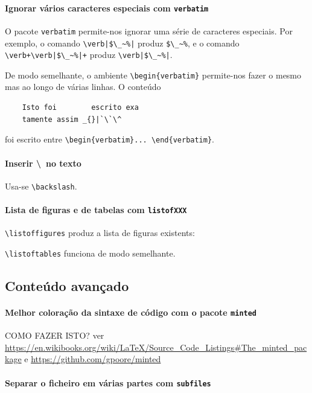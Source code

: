 \documentclass[11pt]{article}
\begin{document}
\paragraph{Ignorar vários caracteres especiais com \texttt{verbatim}}
O pacote \texttt{verbatim} permite-nos ignorar uma série de caracteres especiais.
Por exemplo, o comando \verb+\verb|$\_~%|+ produz \verb|$\_~%|, e o comando
\verb-\verb+\verb|$\_~%|+- produz \verb+\verb|$\_~%|+.

De modo semelhante, o ambiente \verb|\begin{verbatim}| permite-nos fazer o mesmo
mas ao longo de várias linhas. O conteúdo
\begin{verbatim}
    Isto foi        escrito exa
    tamente assim _{}|`\`\^
\end{verbatim}
foi escrito entre \verb|\begin{verbatim}... \end{verbatim}|.

\paragraph{Inserir \textbackslash~no texto}
Usa-se \verb|\backslash|.

\paragraph{Lista de figuras e de tabelas com \texttt{listofXXX}}
\verb|\listoffigures| produz a lista de figuras existents:

\listoffigures

\verb|\listoftables| funciona de modo semelhante.

\subsection{Conteúdo avançado}

\paragraph{Melhor coloração da sintaxe de código com o pacote \texttt{minted}}
{\color{red} COMO FAZER ISTO?} ver
\url{https://en.wikibooks.org/wiki/LaTeX/Source_Code_Listings#The_minted_package} e
\url{https://github.com/gpoore/minted}

\paragraph{Separar o ficheiro em várias partes com \texttt{subfiles}}
\end{document}
